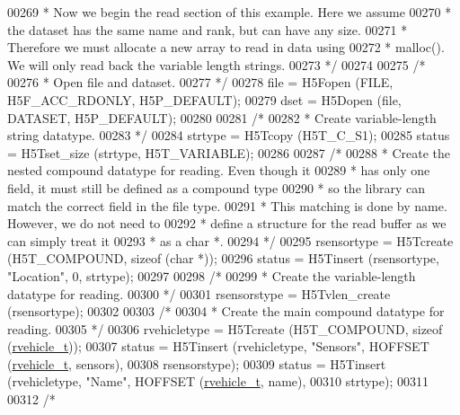 \begin{DoxyCode}
00269 \textcolor{comment}{     * Now we begin the read section of this example.  Here we assume}
00270 \textcolor{comment}{     * the dataset has the same name and rank, but can have any size.}
00271 \textcolor{comment}{     * Therefore we must allocate a new array to read in data using}
00272 \textcolor{comment}{     * malloc().  We will only read back the variable length strings.}
00273 \textcolor{comment}{     */}
00274 
00275     \textcolor{comment}{/*}
00276 \textcolor{comment}{     * Open file and dataset.}
00277 \textcolor{comment}{     */}
00278     file = H5Fopen (FILE, H5F\_ACC\_RDONLY, H5P\_DEFAULT);
00279     dset = H5Dopen (file, DATASET, H5P\_DEFAULT);
00280 
00281     \textcolor{comment}{/*}
00282 \textcolor{comment}{     * Create variable-length string datatype.}
00283 \textcolor{comment}{     */}
00284     strtype = H5Tcopy (H5T\_C\_S1);
00285     status = H5Tset\_size (strtype, H5T\_VARIABLE);
00286 
00287     \textcolor{comment}{/*}
00288 \textcolor{comment}{     * Create the nested compound datatype for reading.  Even though it}
00289 \textcolor{comment}{     * has only one field, it must still be defined as a compound type}
00290 \textcolor{comment}{     * so the library can match the correct field in the file type.}
00291 \textcolor{comment}{     * This matching is done by name.  However, we do not need to}
00292 \textcolor{comment}{     * define a structure for the read buffer as we can simply treat it}
00293 \textcolor{comment}{     * as a char *.}
00294 \textcolor{comment}{     */}
00295     rsensortype = H5Tcreate (H5T\_COMPOUND, \textcolor{keyword}{sizeof} (\textcolor{keywordtype}{char} *));
00296     status = H5Tinsert (rsensortype, \textcolor{stringliteral}{"Location"}, 0, strtype);
00297 
00298     \textcolor{comment}{/*}
00299 \textcolor{comment}{     * Create the variable-length datatype for reading.}
00300 \textcolor{comment}{     */}
00301     rsensorstype = H5Tvlen\_create (rsensortype);
00302 
00303     \textcolor{comment}{/*}
00304 \textcolor{comment}{     * Create the main compound datatype for reading.}
00305 \textcolor{comment}{     */}
00306     rvehicletype = H5Tcreate (H5T\_COMPOUND, \textcolor{keyword}{sizeof} (\hyperlink{structrvehicle__t}{rvehicle\_t}));
00307     status = H5Tinsert (rvehicletype, \textcolor{stringliteral}{"Sensors"}, HOFFSET (\hyperlink{structrvehicle__t}{rvehicle\_t}, sensors),
00308                 rsensorstype);
00309     status = H5Tinsert (rvehicletype, \textcolor{stringliteral}{"Name"}, HOFFSET (\hyperlink{structrvehicle__t}{rvehicle\_t}, name),
00310                 strtype);
00311 
00312     \textcolor{comment}{/*}

\end{DoxyCode}
